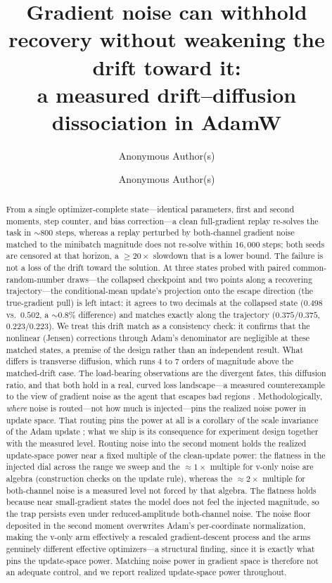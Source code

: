 \documentclass[10pt]{article}
\author{Anonymous Author(s)}
\date{}
\title{Gradient noise can withhold recovery without weakening the drift toward it:\\ a measured drift--diffusion dissociation in AdamW}
\author{Anonymous Author(s)}
\date{}
\begin{document}
\maketitle

\begin{abstract}
From a single optimizer-complete state---identical parameters, first and second moments, step counter, and bias correction---a clean full-gradient replay re-solves the task in ${\sim}800$ steps, whereas a replay perturbed by both-channel gradient noise matched to the minibatch magnitude does not re-solve within $16{,}000$ steps; both seeds are censored at that horizon, a ${\geq}20\times$ slowdown that is a lower bound.
The failure is not a loss of the drift toward the solution. At three states probed with paired common-random-number draws---the collapsed checkpoint and two points along a recovering trajectory---the conditional-mean update's projection onto the escape direction (the true-gradient pull) is left intact: it agrees to two decimals at the collapsed state ($0.498$ vs.\ $0.502$, a ${\sim}0.8\%$ difference) and matches exactly along the trajectory ($0.375/0.375$, $0.223/0.223$). We treat this drift match as a consistency check: it confirms that the nonlinear (Jensen) corrections through Adam's denominator are negligible at these matched states, a premise of the design rather than an independent result. What differs is transverse diffusion, which runs $4$ to $7$ orders of magnitude above the matched-drift case. The load-bearing observations are the divergent fates, this diffusion ratio, and that both hold in a real, curved loss landscape---a measured counterexample to the view of gradient noise as the agent that escapes bad regions \citep{saddle,zhu}.
Methodologically, \emph{where} noise is routed---not how much is injected---pins the realized noise power in update space. That routing pins the power at all is a corollary of the scale invariance of the Adam update \citep{adam}; what we ship is its consequence for experiment design together with the measured level. Routing noise into the second moment holds the realized update-space power near a fixed multiple of the clean-update power: the flatness in the injected dial across the range we sweep and the ${\approx}1\times$ multiple for v-only noise are algebra (construction checks on the update rule), whereas the ${\approx}2\times$ multiple for both-channel noise is a measured level not forced by that algebra. The flatness holds because near small-gradient states the model does not feel the injected magnitude, so the trap persists even under reduced-amplitude both-channel noise. The noise floor deposited in the second moment overwrites Adam's per-coordinate normalization, making the v-only arm effectively a rescaled gradient-descent process and the arms genuinely different effective optimizers---a structural finding, since it is exactly what pins the update-space power. Matching noise power in gradient space is therefore not an adequate control, and we report realized update-space power throughout.

\end{abstract}
\end{document}
